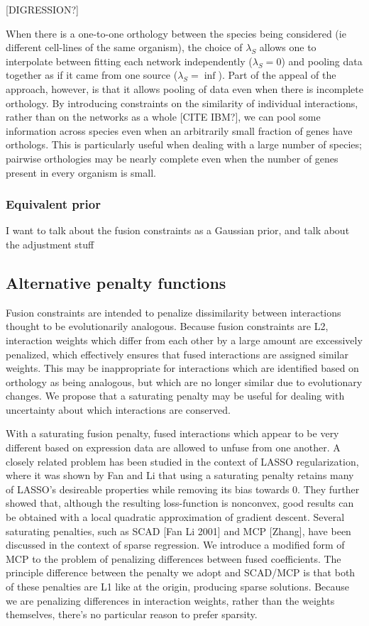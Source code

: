 \documentclass[11pt]{article}
\begin{document}
[DIGRESSION?]

When there is a one-to-one orthology between the species being considered (ie different cell-lines of the same organism), the choice of $\lambda_S$ allows one to interpolate between fitting each network independently ($\lambda_S=0$) and pooling data together as if it came from one source ($\lambda_S=\inf$). Part of the appeal of the approach, however, is that it allows pooling of data even when there is incomplete orthology. By introducing constraints on the similarity of individual interactions, rather than on the networks as a whole [CITE IBM?], we can pool some information across species even when an arbitrarily small fraction of genes have orthologs. This is particularly useful when dealing with a large number of species; pairwise orthologies may be nearly complete even when the number of genes present in every organism is small. 
\subsubsection{Equivalent prior}
I want to talk about the fusion constraints as a Gaussian prior, and talk about the adjustment stuff

\subsection{Alternative penalty functions}
Fusion constraints are intended to penalize dissimilarity between interactions thought to be evolutionarily analogous. Because fusion constraints are L2, interaction weights which differ from each other by a large amount are excessively penalized, which effectively ensures that fused interactions are assigned similar weights. This may be inappropriate for interactions which are identified based on orthology as being analogous, but which are no longer similar due to evolutionary changes. We propose that a saturating penalty may be useful for dealing with uncertainty about which interactions are conserved. 

With a saturating fusion penalty, fused interactions which appear to be very different based on expression data are allowed to unfuse from one another. A closely related problem has been studied in the context of LASSO regularization, where it was shown by Fan and Li that using a saturating penalty retains many of LASSO's desireable properties while removing its bias towards 0. They further showed that, although the resulting loss-function is nonconvex, good results can be obtained with a local quadratic approximation of gradient descent. Several saturating penalties, such as SCAD [Fan Li 2001] and MCP [Zhang], have been discussed in the context of sparse regression. We introduce a modified form of MCP to the problem of penalizing differences between fused coefficients. The principle difference between the penalty we adopt and SCAD/MCP is that both of these penalties are L1 like at the origin, producing sparse solutions. Because we are penalizing differences in interaction weights, rather than the weights themselves, there's no particular reason to prefer sparsity. 
\end{document}
